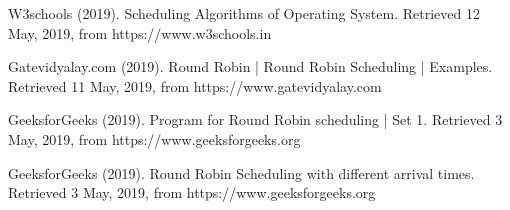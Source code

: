 \documentclass[12pt]{article}
\begin{document}
W3schools (2019). Scheduling Algorithms of Operating System. Retrieved 12 May,
2019, from https://www.w3schools.in

Gatevidyalay.com (2019). Round Robin | Round Robin Scheduling | Examples.
Retrieved 11 May, 2019, from https://www.gatevidyalay.com

GeeksforGeeks (2019). Program for Round Robin scheduling | Set 1. Retrieved 3
May, 2019, from https://www.geeksforgeeks.org

GeeksforGeeks (2019). Round Robin Scheduling with different arrival times.
Retrieved 3 May, 2019, from https://www.geeksforgeeks.org
\end{document}
